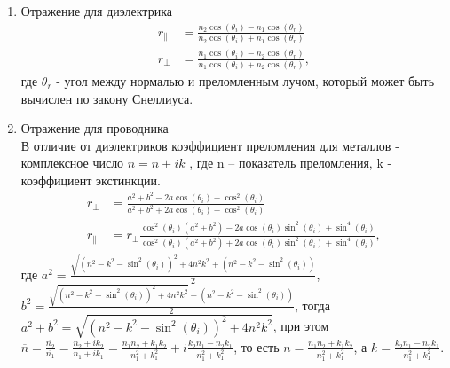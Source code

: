 \begin{enumerate}
    \item Отражение для диэлектрика
          \begin{align}
              r_\parallel & = \frac{n_2\cos(\theta_i) - n_1\cos(\theta_r)}
                                   {n_2\cos(\theta_i) + n_1\cos(\theta_r)} \\
              r_\perp     & = \frac{n_1\cos(\theta_i) - n_2\cos(\theta_r)}
                                   {n_1\cos(\theta_i) + n_2\cos(\theta_r)},
          \end{align}
          где $\theta_r$ - угол между нормалью и преломленным лучом, который
          может быть вычислен по закону Снеллиуса.
    \item Отражение для проводника \\
          В отличие от диэлектриков коэффициент преломления для металлов -
          комплексное число $\overline{n} = n + ik$ , где n -- показатель
          преломления, k - коэффициент экстинкции.
          \begin{align}
              r_\perp     & = \frac{a^2 + b^2 - 2a\cos(\theta_i) + \cos^2(\theta_i)}
                                   {a^2 + b^2 + 2a\cos(\theta_i) + \cos^2(\theta_i)} \\
              r_\parallel & = r_\perp \frac{\cos^2(\theta_i)(a^2 + b^2)
                                            - 2a\cos(\theta_i)\sin^2(\theta_i)
                                            + \sin^4(\theta_i)}
                                           {\cos^2(\theta_i)(a^2 + b^2)
                                            + 2a\cos(\theta_i)\sin^2(\theta_i)
                                            + \sin^4(\theta_i)},
          \end{align}
          где $a^2 = \frac{\sqrt{(n^2 - k^2 - \sin^2(\theta_i))^2 + 4 n^2 k^2}
                           + (n^2 - k^2 - \sin^2(\theta_i))}
                          {2}$,
              $b^2 = \frac{\sqrt{(n^2 - k^2 - \sin^2(\theta_i))^2 + 4 n^2 k^2}
                           - (n^2 - k^2 - \sin^2(\theta_i))}
                          {2}$,
          тогда $a^2 + b^2 = \sqrt{(n^2 - k^2 - \sin^2(\theta_i))^2 + 4 n^2 k^2}$,
          при этом $\overline{n} = \frac{\overline{n_2}}{\overline{n_1}}
                                 = \frac{n_2 + i k_2}{n_1 + i k_1}
                                 = \frac{n_1 n_2 + k_1 k_2}{n_1^2+k_1^2}
                                   + i \frac{k_2 n_1 - n_2 k_1}{n_1^2+k_1^2}$,
          то есть $n = \frac{n_1 n_2 + k_1 k_2}{n_1^2+k_1^2}$,
          а $k = \frac{k_2 n_1 - n_2 k_1}{n_1^2+k_1^2}$.
\end{enumerate}


